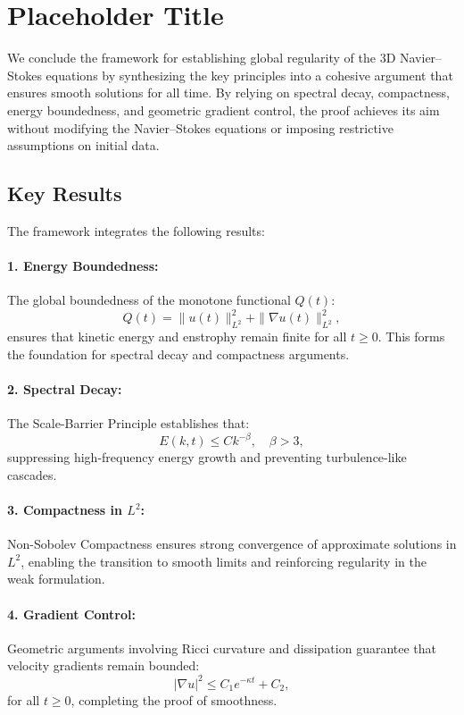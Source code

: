 \section{Placeholder Title}

We conclude the framework for establishing global regularity of the 3D Navier--Stokes equations by synthesizing the key principles into a cohesive argument that ensures smooth solutions for all time. By relying on spectral decay, compactness, energy boundedness, and geometric gradient control, the proof achieves its aim without modifying the Navier--Stokes equations or imposing restrictive assumptions on initial data.

\subsection{Key Results}
The framework integrates the following results:

\paragraph{1. Energy Boundedness:} The global boundedness of the monotone functional $Q(t)$:
\begin{equation}
Q(t) = \|u(t)\|_{L^2}^2 + \|\nabla u(t)\|_{L^2}^2,
\end{equation}
ensures that kinetic energy and enstrophy remain finite for all $t \geq 0$. This forms the foundation for spectral decay and compactness arguments.

\paragraph{2. Spectral Decay:} The Scale-Barrier Principle establishes that:
\begin{equation}
E(k, t) \leq C k^{-\beta}, \quad \beta > 3,
\end{equation}
suppressing high-frequency energy growth and preventing turbulence-like cascades.

\paragraph{3. Compactness in $L^2$:} Non-Sobolev Compactness ensures strong convergence of approximate solutions in $L^2$, enabling the transition to smooth limits and reinforcing regularity in the weak formulation.

\paragraph{4. Gradient Control:} Geometric arguments involving Ricci curvature and dissipation guarantee that velocity gradients remain bounded:
\begin{equation}
|\nabla u|^2 \leq C_1 e^{-\kappa t} + C_2,
\end{equation}
for all $t \geq 0$, completing the proof of smoothness.

